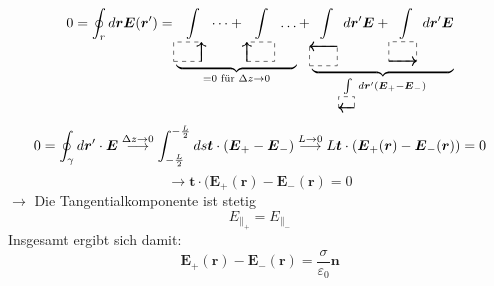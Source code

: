\documentclass[titlepage,11pt,a4paper,ngerman]{report}
\newcommand{\tx}[1]{\textrm{#1}}
\newcommand{\ub}[1]{\underbrace{#1}}
\renewcommand{\vec}[1]{\boldsymbol{#1}}
\renewcommand{\epsilon}{\varepsilon}
\begin{document}
\begin{equation*}
0 = \oint_r d\vec{r} \vec{E}(\vec{r}') = \ub{
	\int\limits_{\begin{tikzpicture}[scale=.7]
		\draw[dashed] (0,0) -- (1,0) -- (1,.7) -- (0,.7) -- (0,0);
		\draw[thick,->] (1,0) -- (1,.7);
		\end{tikzpicture}} \dots + 
	\int\limits_{\begin{tikzpicture}[scale=.7]
		\draw[dashed] (0,0) -- (1,0) -- (1,.7) -- (0,.7) -- (0,0);
		\draw[thick,->] (0,0) -- (0,.7);
		\end{tikzpicture}} \dots}_{= 0 \tx{ für } \Delta z \to 0} + \ub{
	\int\limits_{\begin{tikzpicture}[scale=.7]
		\draw[dashed] (0,0) -- (1,0) -- (1,.7) -- (0,.7) -- (0,0);
		\draw[thick,->] (1,.7) -- (0,.7);
		\end{tikzpicture}} d\vec{r}' \vec{E} + 
	\int\limits_{\begin{tikzpicture}[scale=.7]
		\draw[dashed] (0,0) -- (1,0) -- (1,.7) -- (0,.7) -- (0,0);
		\draw[thick,->] (0,0) -- (1,0);
		\end{tikzpicture}} d\vec{r}' \vec{E} }_{
	\int\limits_{\begin{tikzpicture}[scale=.4]
		\draw[dashed] (0,0) -- (1,0) -- (1,.7) -- (0,.7) -- (0,0);
		\draw[thick,->] (1,0) -- (0,0);
		\end{tikzpicture}} d\vec{r}' (\vec{E}_+ -  \vec{E}_-)}
\end{equation*}
\begin{equation*}
0 = \oint_\gamma d\vec{r}' \cdot \vec{E} \buildrel \Delta z \to 0 \over \longrightarrow \int_{-\frac{L}{2}}^{-\frac{L}{2}} ds \vec{t} \cdot \left(\vec{E}_+ - \vec{E}_-\right) \buildrel L \to 0 \over \longrightarrow L \vec{t} \cdot \left(\vec{E}_+(\vec{r}) - \vec{E}_-(\vec{r})\right) = 0
\end{equation*}
\begin{equation*}
\rightarrow \vec{t} \cdot (\vec{E}_+ (\vec{r}) - \vec{E}_- (\vec{r}) = 0
\end{equation*}
$\rightarrow $ Die Tangentialkomponente ist stetig
\begin{equation*}
E_{\parallel_{+}} = E_{\parallel_{-}}
\end{equation*}
Insgesamt ergibt sich damit:
\begin{equation*}
\vec{E}_+(\vec{r}) - \vec{E}_-(\vec{r}) = \frac{\sigma}{\epsilon_0} \vec{n}
\end{equation*}
\end{document}
